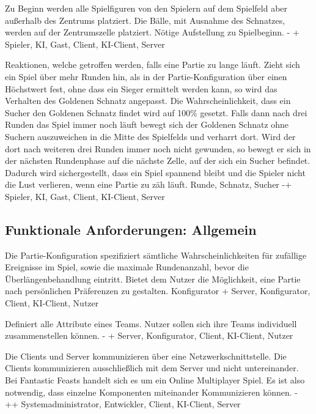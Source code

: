         {Zu Beginn werden alle Spielfiguren von den Spielern auf dem Spielfeld aber außerhalb des Zentrums platziert. Die Bälle, mit Ausnahme des Schnatzes, werden auf der Zentrumszelle platziert.}
        {Nötige Aufstellung zu Spielbeginn.}
        {-}
        {+}
        {Spieler, KI, Gast, Client, KI-Client, Server}
        
        {Reaktionen, welche getroffen werden, falls eine Partie zu lange läuft. Zieht sich ein Spiel über mehr Runden hin, als in der Partie-Konfiguration über einen Höchstwert fest,  ohne dass ein Sieger ermittelt werden kann, so wird das Verhalten des Goldenen Schnatz angepasst. Die Wahrscheinlichkeit, dass ein Sucher den Goldenen Schnatz findet wird auf 100\% gesetzt. Falls dann nach drei Runden das Spiel immer noch läuft bewegt sich der Goldenen Schnatz ohne Suchern auszuweichen in die Mitte des Spielfelds und verharrt dort. Wird der dort nach weiteren drei Runden immer noch nicht gewunden, so bewegt er sich in der nächsten Rundenphase auf die nächste Zelle, auf der sich ein Sucher befindet.}
        {Dadurch wird sichergestellt, dass ein Spiel spannend bleibt und die Spieler nicht die Lust verlieren, wenn eine Partie zu zäh läuft.}
        {Runde, Schnatz, Sucher}
        {-+}
        {Spieler, KI, Gast, Client, KI-Client, Server}


\subsection{Funktionale Anforderungen: Allgemein}

        {Die Partie-Konfiguration spezifiziert sämtliche Wahrscheinlichkeiten für zufällige Ereignisse im Spiel, sowie die maximale Rundenanzahl, bevor die Überlängenbehandlung eintritt.}
        {Bietet dem Nutzer die Möglichkeit, eine Partie nach persönlichen Präferenzen zu gestalten.}
        {Konfigurator}
        {+}
        {Server, Konfigurator, Client, KI-Client, Nutzer}

        {Definiert alle Attribute eines Teams.}
        {Nutzer sollen sich ihre Teams individuell zusammenstellen können.}
        {-}
        {+}
        {Server, Konfigurator, Client, KI-Client, Nutzer}	
        
        {Die Clients und Server kommunizieren über eine Netzwerkschnittstelle. Die Clients kommunizieren ausschließlich mit dem Server und nicht untereinander.}
        {Bei \glqq{}Fantastic Feasts\grqq{} handelt sich es um ein Online Multiplayer Spiel. Es ist also notwendig, dass einzelne Komponenten miteinander Kommunizieren können.}
        {-}
        {++}
        {Systemadministrator, Entwickler, Client, KI-Client, Server}

